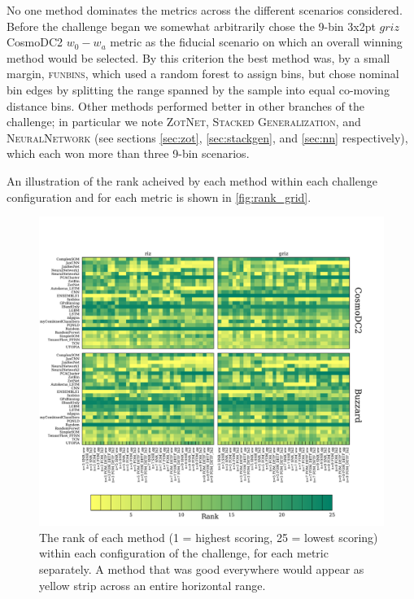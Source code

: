 \documentclass[twocolumn,twocolappendix]{aastex63}
\begin{document}
No one method dominates the metrics across the different scenarios considered.
Before the challenge began we somewhat arbitrarily chose 
the 9-bin 3x2pt $griz$ CosmoDC2 $w_0-w_a$ metric as the fiducial scenario on which
an overall winning method would be selected.
By this criterion the best method was, by a small margin, \textsc{funbins},
which used a random forest to assign bins, but chose nominal bin edges by splitting the range spanned
by the sample into equal co-moving distance bins. 
Other methods performed better in other branches of the challenge; in particular we note \textsc{ZotNet}, \textsc{Stacked Generalization}, and \textsc{NeuralNetwork} (see sections \ref{sec:zot}, \ref{sec:stackgen}, and \ref{sec:nn} respectively), which each won more than three 9-bin scenarios.

An illustration of the rank acheived by each method within each challenge configuration and for each metric
is shown in \autoref{fig:rank_grid}.



\begin{figure}[htbp]
	\includegraphics[width=\linewidth]{results/rank_grid.pdf}
	\caption{The rank of each method (1 = highest scoring, 25 = lowest scoring) within each configuration of the challenge, for each metric separately.  A method that was good everywhere would appear as yellow strip across an entire horizontal range.}
	\label{fig:rank_grid}
\end{figure}
\end{document}
